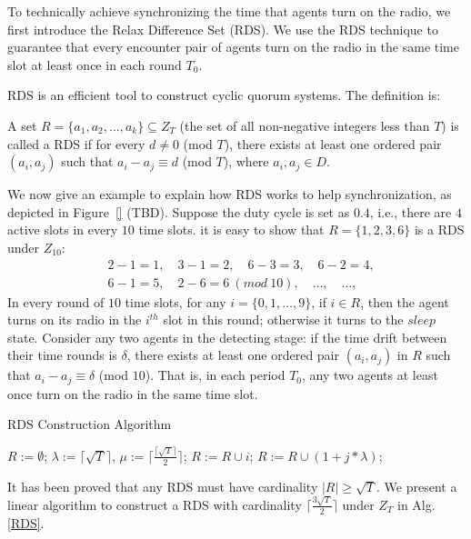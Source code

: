 To technically achieve synchronizing the time that agents turn on the radio,
we first introduce the Relax Difference Set (RDS).
We use the RDS technique to guarantee that every encounter pair 
of agents turn on the radio in the same time slot at least once in each round $T_0$.

RDS is an efficient tool to construct cyclic quorum systems. 
The definition is:
\begin{definition}
A set $R=\{a_1,a_2,...,a_k\} \subseteq Z_T$ (the set of all non-negative integers less than $T$)
is called a RDS if for every $d \neq 0$ (mod $T$),
there exists at least one ordered pair $(a_i,a_j)$ such that $a_i - a_j \equiv d$ (mod $T$), 
where $a_i,a_j \in D$.
\end{definition}

We now give an example to explain how RDS works to help synchronization, 
as depicted in Figure~\ref{} (TBD).
Suppose the duty cycle is set as $0.4$, i.e., there are $4$ active slots 
in every $10$ time slots. it is easy to show that $R=\{1,2,3,6\}$ is a RDS
under $Z_{10}$:
\begin{align*}
    &2 - 1 = 1,\quad 3 - 1 = 2,\quad 6 - 3 = 3,\quad 6 - 2 = 4, \\
    &6 - 1 = 5,\quad {2 - 6 = 6}~{(mod~10)},\quad \dots,\quad \dots, 
\end{align*}
In every round of $10$ time slots, for any $i = \{0,1,\dots,9\}$, if $i \in R$, then
the agent turns on its radio in the $i^{th}$ slot in this round; otherwise it turns to the $sleep$ state.
Consider any two agents in the detecting stage: if the time drift between their time rounds is $\delta$,
there exists at least one ordered pair $(a_i,a_j)$ in $R$ such that $a_i - a_j \equiv \delta$ (mod $10$).
That is, in each period $T_0$, any two agents at least once turn on the radio in the same time slot.

\begin{algorithm}[!h]
    \caption{RDS Construction Algorithm}
    \label{RDS}
    \begin{algorithmic}[1]
    \STATE $R :=\emptyset$; $\lambda :=\lceil \sqrt{T}  \rceil$,
    $\mu :=\lceil \frac{\lceil \sqrt{T} \rceil}{2} \rceil$;\label{RDSline1}
        \STATE $R :=R \cup i$; \label{RDSline2}
    \ENDFOR
        \STATE $R :=R \cup (1 + j * \lambda )$; \label{RDSline3}
    \ENDFOR
    \end{algorithmic}
\end{algorithm}

It has been proved that any RDS must have cardinality $|R| \geq \sqrt{T}$\cite{luk1997two}.
We present a linear algorithm to construct a RDS with 
cardinality $\lceil \frac{3\sqrt{T}}{2}  \rceil$ under $Z_T$ in Alg. \ref{RDS}.

